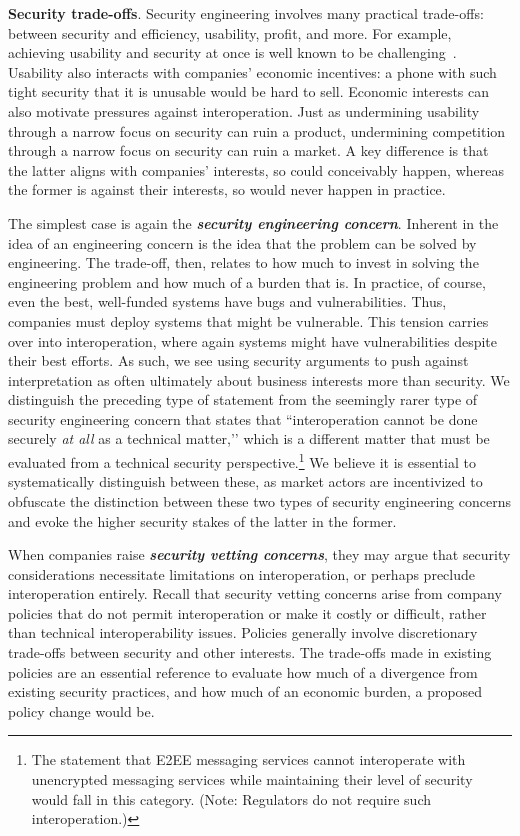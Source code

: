 \documentclass[letterpaper,twocolumn,10pt]{article}
\newcommand{\bi}[1]{\textbf{\textit{#1}}}
\newcommand{\subh}[1]{\smallskip \noindent \textbf{{#1}}.}
\renewcommand{\paragraph}[1]{\subh{#1}}
\begin{document}
\paragraph{Security trade-offs}
Security engineering involves many practical trade-offs: between security and efficiency, usability, profit, and more. For example, achieving usability and security at once is well known to be challenging~\cite{usability_book}. Usability also interacts with companies' economic incentives: a phone with such tight security that it is unusable would be hard to sell.  
Economic interests can also motivate pressures against interoperation. Just as undermining usability through a narrow focus on security can ruin a product,  undermining competition through a narrow focus on security can ruin a market. A key difference is that the latter aligns with companies' interests, so could conceivably happen, whereas the former is against their interests, so would never happen in practice.

The simplest case is again the \bi{security engineering concern}. Inherent in the idea of an engineering concern is the idea that the problem can be solved by engineering. The trade-off, then, relates to how much to invest in solving the engineering problem and how much of a burden that is. In practice, of course, even the best, well-funded systems have bugs and vulnerabilities. Thus, companies must deploy systems that might be vulnerable.  This tension carries over into interoperation, where again systems might have vulnerabilities despite their best efforts. As such, we see using security arguments to push against interpretation as often ultimately about business interests more than security. 
We distinguish the preceding type of statement from the seemingly rarer type of security engineering concern that states that ``interoperation cannot be done securely \emph{at all} as a technical matter,’’ which is a different matter that must be evaluated from a technical security perspective.\footnote{The statement that E2EE messaging services cannot interoperate with unencrypted messaging services while maintaining their level of security would fall in this category. (Note: Regulators do not require such interoperation.)} We believe it is essential to systematically distinguish between these, as market actors are incentivized to obfuscate the distinction between these two types of security engineering concerns and evoke the higher security stakes of the latter in the former.


When companies raise \bi{security vetting concerns}, they may argue that security considerations necessitate limitations on interoperation, or perhaps preclude interoperation entirely. Recall that security vetting concerns arise from company policies that do not permit interoperation or make it costly or difficult, rather than technical interoperability issues. Policies generally involve discretionary trade-offs between security and other interests. The trade-offs made in existing policies are an essential reference to evaluate how much of a divergence from existing security practices, and how much of an economic burden, a proposed policy change would be. 
\end{document}
